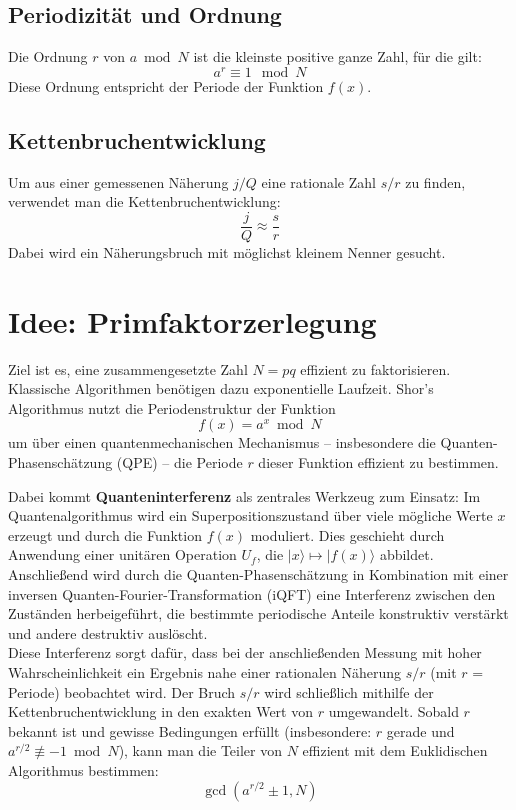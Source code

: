 \subsection{Periodizität und Ordnung}
Die Ordnung \( r \) von \( a \bmod N \) ist die kleinste positive ganze Zahl, für die gilt:
\[
a^r \equiv 1 \mod N
\]
Diese Ordnung entspricht der Periode der Funktion \( f(x) \).

\subsection{Kettenbruchentwicklung}
Um aus einer gemessenen Näherung \( j/Q \) eine rationale Zahl \( s/r \) zu finden, verwendet man die Kettenbruchentwicklung:
\[
\frac{j}{Q} \approx \frac{s}{r}
\]
Dabei wird ein Näherungsbruch mit möglichst kleinem Nenner gesucht.

\section{Idee: Primfaktorzerlegung}

Ziel ist es, eine zusammengesetzte Zahl \( N = pq \) effizient zu faktorisieren. Klassische Algorithmen benötigen dazu exponentielle Laufzeit. Shor's Algorithmus nutzt die Periodenstruktur der Funktion
\[
f(x) = a^x \bmod N
\]
um über einen quantenmechanischen Mechanismus – insbesondere die Quanten-Phasenschätzung (QPE) – die Periode \( r \) dieser Funktion effizient zu bestimmen.

\noindent Dabei kommt \textbf{Quanteninterferenz} als zentrales Werkzeug zum Einsatz: Im Quantenalgorithmus wird ein Superpositionszustand über viele mögliche Werte \( x \) erzeugt und durch die Funktion \( f(x) \) moduliert. Dies geschieht durch Anwendung einer unitären Operation \( U_f \), die \( |x\rangle \mapsto |f(x)\rangle \) abbildet. Anschließend wird durch die Quanten-Phasenschätzung in Kombination mit einer inversen Quanten-Fourier-Transformation (iQFT) eine Interferenz zwischen den Zuständen herbeigeführt, die bestimmte periodische Anteile konstruktiv verstärkt und andere destruktiv auslöscht.\\

\noindent Diese Interferenz sorgt dafür, dass bei der anschließenden Messung mit hoher Wahrscheinlichkeit ein Ergebnis nahe einer rationalen Näherung \( s/r \) (mit \( r \) = Periode) beobachtet wird. Der Bruch \( s/r \) wird schließlich mithilfe der Kettenbruchentwicklung in den exakten Wert von \( r \) umgewandelt. Sobald \( r \) bekannt ist und gewisse Bedingungen erfüllt (insbesondere: \( r \) gerade und \( a^{r/2} \not\equiv -1 \bmod N \)), kann man die Teiler von \( N \) effizient mit dem Euklidischen Algorithmus bestimmen:
\[
\gcd(a^{r/2} \pm 1, N)
\]

